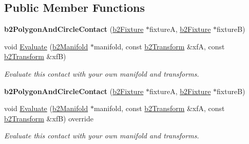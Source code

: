 \subsection*{Public Member Functions}
\begin{DoxyCompactItemize}
\item 
\mbox{\label{classb2PolygonAndCircleContact_a38158da229eee22253c1f64df1982e40}} 
{\bfseries b2\+Polygon\+And\+Circle\+Contact} (\hyperlink{classb2Fixture}{b2\+Fixture} $\ast$fixtureA, \hyperlink{classb2Fixture}{b2\+Fixture} $\ast$fixtureB)
\item 
\mbox{\label{classb2PolygonAndCircleContact_ac24d495022aae853cb573f86c8d86c3d}} 
void \hyperlink{classb2PolygonAndCircleContact_ac24d495022aae853cb573f86c8d86c3d}{Evaluate} (\hyperlink{structb2Manifold}{b2\+Manifold} $\ast$manifold, const \hyperlink{structb2Transform}{b2\+Transform} \&xfA, const \hyperlink{structb2Transform}{b2\+Transform} \&xfB)
\begin{DoxyCompactList}\small\item\em Evaluate this contact with your own manifold and transforms. \end{DoxyCompactList}\item 
\mbox{\label{classb2PolygonAndCircleContact_a38158da229eee22253c1f64df1982e40}} 
{\bfseries b2\+Polygon\+And\+Circle\+Contact} (\hyperlink{classb2Fixture}{b2\+Fixture} $\ast$fixtureA, \hyperlink{classb2Fixture}{b2\+Fixture} $\ast$fixtureB)
\item 
\mbox{\label{classb2PolygonAndCircleContact_a4af8338f124be0b7ec704997be4736b1}} 
void \hyperlink{classb2PolygonAndCircleContact_a4af8338f124be0b7ec704997be4736b1}{Evaluate} (\hyperlink{structb2Manifold}{b2\+Manifold} $\ast$manifold, const \hyperlink{structb2Transform}{b2\+Transform} \&xfA, const \hyperlink{structb2Transform}{b2\+Transform} \&xfB) override
\begin{DoxyCompactList}\small\item\em Evaluate this contact with your own manifold and transforms. \end{DoxyCompactList}\end{DoxyCompactItemize}
